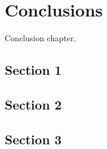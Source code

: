 \chapter{Conclusions}
\label{ch:conclusion}

Conclusion chapter. 

\section{Section 1}

\section{Section 2}

\section{Section 3}
